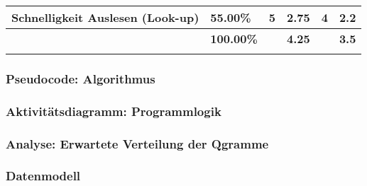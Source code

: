\begin{table}[]
\begin{tabular}{llllll}
        \multicolumn{1}{|l|}{Schnelligkeit Auslesen (Look-up)}                              & \multicolumn{1}{l|}{55.00\%}                                                                          & \multicolumn{1}{l|}{5}                                                                 & \multicolumn{1}{l|}{2.75}                                                           & \multicolumn{1}{l|}{4}                                                                 & \multicolumn{1}{l|}{2.2}                                                            \\ \hline
        \rowcolor[HTML]{BBDAFF}
        \multicolumn{1}{|l|}{\cellcolor[HTML]{BBDAFF}\textbf{Gesamt}}                       & \multicolumn{1}{l|}{\cellcolor[HTML]{BBDAFF}\textbf{100.00\%}}                                        & \multicolumn{1}{l|}{\cellcolor[HTML]{BBDAFF}\textbf{}}                                 & \multicolumn{1}{l|}{\cellcolor[HTML]{BBDAFF}\textbf{4.25}}                          & \multicolumn{1}{l|}{\cellcolor[HTML]{BBDAFF}\textbf{}}                                 & \multicolumn{1}{l|}{\cellcolor[HTML]{BBDAFF}\textbf{3.5}}                           \\ \hline
                                                                                            &                                                                                                       &                                                                                        &                                                                                     &                                                                                        &                                                                                     \\ \hline
    \end{tabular}
\end{table}

\subsubsection{Pseudocode: Algorithmus}
\subsubsection{Aktivitätsdiagramm: Programmlogik}
\subsubsection{Analyse: Erwartete Verteilung der Qgramme}
\subsubsection{Datenmodell}
